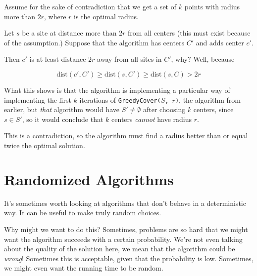 \documentclass[12pt]{article}
\def\dist{\text{dist}}
\begin{document}
  {
    Assume for the sake of contradiction that we get a set of $k$ points with
    radius more than $2r$, where $r$ is the optimal radius.


    Let $s$ be a site at distance more than $2r$ from all centers (this must
    exist because of the assumption.) Suppose that the algorithm has centers
    $C'$ and adds center $c'$.

    Then $c'$ is at least distance $2r$ away from all sites in $C'$, why? Well,
    because

    \[
      \dist(c', C') \ge \dist(s, C') \ge \dist(s, C) > 2r
    \]

    What this shows is that the algorithm is implementing a particular way of
    implementing the first $k$ iterations of \texttt{GreedyCover($S$, $r$)}, the
    algorithm from earlier, but {\it that} algorithm would have $S' \ne
    \emptyset$ after choosing $k$ centers, since $s \in S'$, so it would
    conclude that $k$ centers {\it cannot} have radius $r$.

    This is a contradiction, so the algorithm must find a radius better than or
    equal twice the optimal solution.
  }




  \newpage
  \section{Randomized Algorithms}

  It's sometimes worth looking at algorithms that don't behave in a
  deterministic way. It can be useful to make truly random choices.

  Why might we want to do this? Sometimes, problems are so hard that we might
  want the algorithm succeeds with a certain probability. We're not even talking
  about the quality of the solution here, we mean that the algorithm could be
  {\it wrong}! Sometimes this is acceptable, given that the probability is low.
  Sometimes, we might even want the running time to be random.
\end{document}
